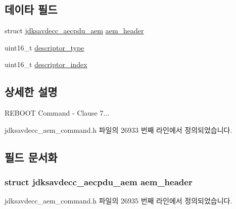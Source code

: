 \subsection*{데이타 필드}
\begin{DoxyCompactItemize}
\item 
struct \hyperlink{structjdksavdecc__aecpdu__aem}{jdksavdecc\+\_\+aecpdu\+\_\+aem} \hyperlink{structjdksavdecc__aem__command__reboot_ae1e77ccb75ff5021ad923221eab38294}{aem\+\_\+header}
\item 
uint16\+\_\+t \hyperlink{structjdksavdecc__aem__command__reboot_ab7c32b6c7131c13d4ea3b7ee2f09b78d}{descriptor\+\_\+type}
\item 
uint16\+\_\+t \hyperlink{structjdksavdecc__aem__command__reboot_a042bbc76d835b82d27c1932431ee38d4}{descriptor\+\_\+index}
\end{DoxyCompactItemize}


\subsection{상세한 설명}
R\+E\+B\+O\+OT Command -\/ Clause 7... 

jdksavdecc\+\_\+aem\+\_\+command.\+h 파일의 26933 번째 라인에서 정의되었습니다.



\subsection{필드 문서화}
\subsubsection[{\texorpdfstring{aem\+\_\+header}{aem_header}}]{\setlength{\rightskip}{0pt plus 5cm}struct {\bf jdksavdecc\+\_\+aecpdu\+\_\+aem} aem\+\_\+header}\hypertarget{structjdksavdecc__aem__command__reboot_ae1e77ccb75ff5021ad923221eab38294}{}\label{structjdksavdecc__aem__command__reboot_ae1e77ccb75ff5021ad923221eab38294}


jdksavdecc\+\_\+aem\+\_\+command.\+h 파일의 26935 번째 라인에서 정의되었습니다.

